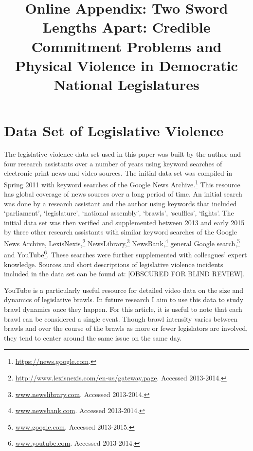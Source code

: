 \documentclass[a4paper]{article}\usepackage[]{graphicx}\usepackage[]{color}
\title{Online Appendix: Two Sword Lengths Apart: Credible Commitment Problems and Physical Violence in Democratic National Legislatures}
\begin{document}
\maketitle



\section*{Data Set of Legislative Violence}


The legislative violence data set used in this paper was built by the author and four research assistants over a number of years using keyword searches of electronic print news and video sources. The initial data set was compiled in Spring 2011 with keyword searches of the Google News Archive.\footnote{\url{https://news.google.com}.} This resource has global coverage of news sources over a long period of time. An initial search was done by a research assistant and the author using keywords that included `parliament', `legislature', `national assembly', `brawls', `scuffles', `fights'. The initial data set was then verified and supplemented between 2013 and early 2015 by three other research assistants with similar keyword searches of the Google News Archive, LexisNexis,\footnote{\url{http://www.lexisnexis.com/en-us/gateway.page}. Accessed 2013-2014.} NewsLibrary,\footnote{\url{www.newslibrary.com}. Accessed 2013-2014.} NewsBank,\footnote{\url{www.newsbank.com}. Accessed 2013-2014.} general Google search,\footnote{\url{www.google.com}. Accessed 2013-2015.} and YouTube\footnote{\url{www.youtube.com}. Accessed 2013-2014.}. These searches were further supplemented with colleagues' expert knowledge. Sources and short descriptions of legislative violence incidents included in the data set can be found at:
[OBSCURED FOR BLIND REVIEW].

YouTube is a particularly useful resource for detailed video data on the size and dynamics of legislative brawls. In future research I aim to use this data to study brawl dynamics once they happen. For this article, it is useful to note that each brawl can be considered a single event. Though brawl intensity varies between brawls and over the course of the brawls as more or fewer legislators are involved, they tend to center around the same issue on the same day.
\end{document}

